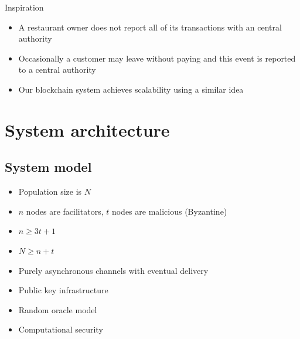 \documentclass{beamer}
\begin{document}
\begin{frame}{Inspiration}
  \begin{itemize}
    \item A restaurant owner does not report all of its transactions with an central authority
    \item Occasionally a customer may leave without paying and this event is reported to a central authority
    \item Our blockchain system achieves scalability using a similar idea
  \end{itemize}
\end{frame}

\section{System architecture}
\subsection{System model}
\begin{frame}{\subsecname}
  \begin{itemize}
    \item Population size is $N$
    \item $n$ nodes are facilitators, $t$ nodes are malicious (Byzantine)
    \item $n \ge 3t + 1$
    \item $N \ge n + t$
    \item Purely asynchronous channels with eventual delivery
    \item Public key infrastructure
    \item Random oracle model
    \item Computational security
  \end{itemize}
\end{frame}
\end{document}
